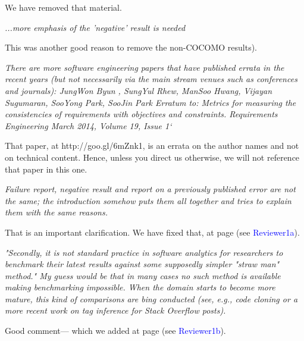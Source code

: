 \documentclass[smallcondesed]{svjour3}
\begin{document}
We have removed
that material.

{\em ...more emphasis of the 'negative' result is needed}

This was another good reason to remove the
non-COCOMO results).

{\em There are more software engineering papers that have published errata in the recent years (but not necessarily via the main stream venues such as conferences and journals): JungWon Byun , SungYul Rhew, ManSoo Hwang, Vijayan Sugumaran, SooYong Park, SooJin Park Erratum to: Metrics for measuring the consistencies of requirements with objectives and constraints. Requirements Engineering March 2014, Volume 19, Issue 1`}

That paper, at http://goo.gl/6mZnk1,
is an errata on the author names
and not on technical content. Hence, unless you direct us otherwise,
we will not reference that paper in this one.

{\em Failure report, negative result and report on a previously published error are not the same; the introduction somehow puts them all together and tries to explain them with the same reasons.}

\newcommand{\WHERE}[1]{page \pageref{err:#1} (see \textcolor{blue}{#1})}

\newcommand{\HERE}[1]{\label{err:#1}
 \reversemarginpar\marginnote{\textcolor{blue}{(#1)}}}

That is an  important clarification.
We have fixed that, at \WHERE{Reviewer1a}.

{\em "Secondly, it is not standard practice in software analytics for researchers to benchmark their latest results against some supposedly simpler "straw man" method." My guess would be that in many cases no such method is available making benchmarking impossible. When the domain starts to become more mature, this kind of comparisons are bing conducted (see, e.g., code cloning or a more recent work on tag inference for Stack Overflow posts).}

Good comment--- which we added
at \WHERE{Reviewer1b}.
\end{document}
